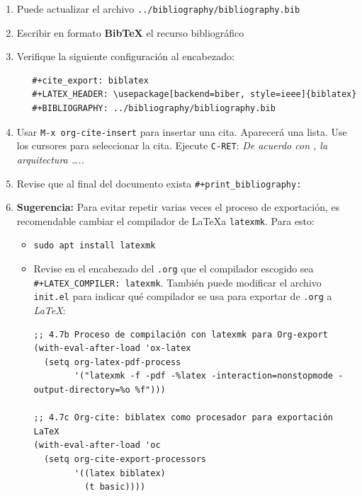 \documentclass{article}
\begin{document}
\begin{enumerate}
\item Puede actualizar el archivo \texttt{../bibliography/bibliography.bib}
\item Escribir en formato \textbf{\textbf{BibTeX}} el recurso bibliográfico
\item Verifique la siguiente configuración al encabezado:
\begin{verbatim}
   #+cite_export: biblatex
   #+LATEX_HEADER: \usepackage[backend=biber, style=ieee]{biblatex}
   #+BIBLIOGRAPHY: ../bibliography/bibliography.bib
\end{verbatim}
\item Usar \texttt{M-x org-cite-insert} para insertar una cita. Aparecerá una
lista. Use los cursores para seleccionar la cita. Ejecute \texttt{C-RET}: \emph{De acuerdo con
\autocite{ledin2022modern}, la arquitectura \ldots{}..}
\item Revise que al final del documento exista \texttt{\#+print\_bibliography:}
\item \textbf{\textbf{Sugerencia:}} Para evitar repetir varias veces el proceso de
exportación, es recomendable cambiar el compilador de \LaTeX a
\texttt{latexmk}. Para esto:
\begin{itemize}
\item \texttt{sudo apt install latexmk}
\item Revise en el encabezado del \texttt{.org} que el compilador escogido sea
\texttt{\#+LATEX\_COMPILER: latexmk}. También puede modificar el archivo
\texttt{init.el} para indicar qué compilador se usa para exportar de
\texttt{.org} a \emph{\LaTeX{}}:
\begin{verbatim}
;; 4.7b Proceso de compilación con latexmk para Org-export
(with-eval-after-load 'ox-latex
  (setq org-latex-pdf-process
        '("latexmk -f -pdf -%latex -interaction=nonstopmode -output-directory=%o %f")))

;; 4.7c Org-cite: biblatex como procesador para exportación LaTeX
(with-eval-after-load 'oc
  (setq org-cite-export-processors
        '((latex biblatex)
          (t basic))))

\end{verbatim}
\end{itemize}
\end{enumerate}
\end{document}
